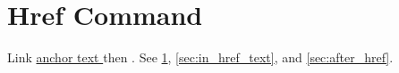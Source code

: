 \documentclass{article}
\begin{document}
\section{Href Command}\label{sec:href_cmd}
Link \href{https://example.org/%7Euser/{id}/x%}{anchor text \cite{k2}\label{sec:in_href_text}} then \cite{k1} \label{sec:after_href}.
See \ref{sec:href_cmd}, \ref{sec:in_href_text}, and \ref{sec:after_href}.


\end{document}
